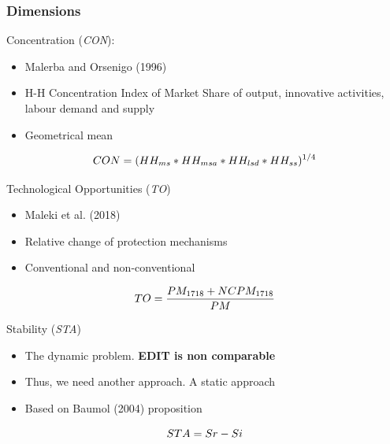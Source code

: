 \documentclass{beamer}
\begin{document}
     \begin{frame}[allowframebreaks]
     	\frametitle{Dimensions}
     	Concentration (\textit{CON}):
     	\begin{itemize}
     		\item Malerba and Orsenigo (1996)
     		\item H-H Concentration Index of Market Share of output, innovative activities, labour demand and supply
     		\item Geometrical mean
     	\end{itemize} 
     	\begin{equation}
     		\centering
     		CON = (HH_{ms}*HH_{msa}*HH_{lsd}*HH_{ss})^{1/4}
     	\end{equation}
     \framebreak
     
     Technological Opportunities (\textit{TO})
     \begin{itemize}
     	\item Maleki et al. (2018)
     	\item Relative change of protection mechanisms 
     	\item Conventional and non-conventional
     \end{itemize}
 	 \begin{equation}
 	 \centering
 	 TO = \dfrac{PM_{1718} + NCPM_{1718}}{PM}
 	 \end{equation}
  	\framebreak
  	
  	Stability (\textit{STA})
  	\begin{itemize}
  		\item The dynamic problem.\textbf{ EDIT is non comparable}
  		\item Thus, we need another approach. A static approach
  		\item Based on Baumol (2004) proposition
  	\end{itemize}
  		\begin{equation}
  		\centering
  		STA = Sr - Si
  		\end{equation}
\end{frame}
\end{document}
